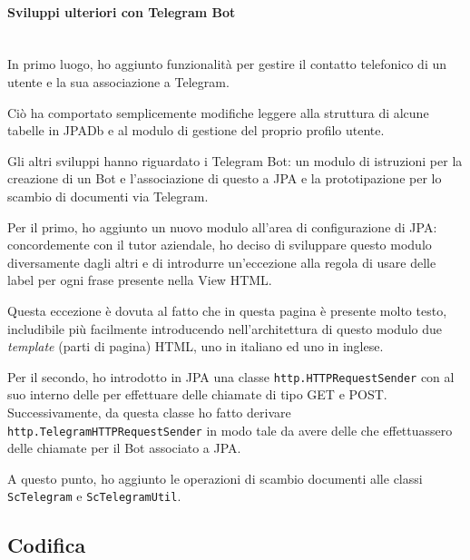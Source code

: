 \paragraph{Sviluppi ulteriori con Telegram Bot} \mbox{} \\

In primo luogo, ho aggiunto funzionalità per gestire il contatto telefonico di
un utente e la sua associazione a Telegram.

Ciò ha comportato semplicemente modifiche leggere alla struttura di alcune
tabelle in JPADb e al modulo di gestione del proprio profilo utente.

Gli altri sviluppi hanno riguardato i Telegram Bot: un modulo di istruzioni per
la creazione di un Bot e l'associazione di questo a JPA e la prototipazione
per lo scambio di documenti via Telegram.

Per il primo, ho aggiunto un nuovo modulo all'area di configurazione di
JPA: concordemente con il tutor aziendale, ho deciso di sviluppare questo
modulo diversamente dagli altri e di introdurre un'eccezione alla regola di
usare delle label per ogni frase presente nella View HTML.

Questa eccezione è dovuta al fatto che in questa pagina è presente molto testo,
includibile più facilmente introducendo nell'architettura di questo modulo due
\emph{template} (parti di pagina) HTML, uno in italiano ed uno in inglese.

Per il secondo, ho introdotto in JPA una classe
\texttt{http.HTTPRequestSender} con al suo interno delle  per
effettuare delle chiamate  di tipo GET e POST. Successivamente, da
questa classe ho fatto derivare \texttt{http.TelegramHTTPRequestSender} in modo
tale da avere delle  che effettuassero delle chiamate per il Bot
associato a JPA.

A questo punto, ho aggiunto le operazioni di scambio documenti alle classi
\texttt{ScTelegram} e \texttt{ScTelegramUtil}.


\subsection{Codifica}\label{sec:prog-codifica}

